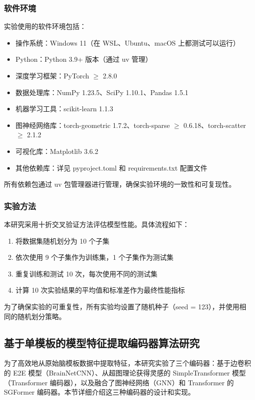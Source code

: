 \documentclass[12pt,a4paper]{article}
\begin{document}
\subsubsection{软件环境}

实验使用的软件环境包括：
\begin{itemize}
\item 操作系统：Windows 11（在 WSL、Ubuntu、macOS 上都测试可以运行）
\item Python：Python 3.9+ 版本（通过 uv 管理）
\item 深度学习框架：PyTorch $\geq$ 2.8.0
\item 数据处理库：NumPy 1.23.5、SciPy 1.10.1、Pandas 1.5.1
\item 机器学习工具：scikit-learn 1.1.3
\item 图神经网络库：torch-geometric 1.7.2、torch-sparse $\geq$ 0.6.18、torch-scatter $\geq$ 2.1.2
\item 可视化库：Matplotlib 3.6.2
\item 其他依赖库：详见 pyproject.toml 和 requirements.txt 配置文件
\end{itemize}

所有依赖包通过 uv 包管理器进行管理，确保实验环境的一致性和可复现性。

\subsubsection{实验方法}

本研究采用十折交叉验证方法评估模型性能。具体流程如下：
\begin{enumerate}
\item 将数据集随机划分为 10 个子集
\item 依次使用 9 个子集作为训练集，1 个子集作为测试集
\item 重复训练和测试 10 次，每次使用不同的测试集
\item 计算 10 次实验结果的平均值和标准差作为最终性能指标
\end{enumerate}

为了确保实验的可重复性，所有实验均设置了随机种子（seed = 123），并使用相同的随机划分策略。

\subsection{基于单模板的模型特征提取编码器算法研究}

为了高效地从原始脑模板数据中提取特征，本研究实验了三个编码器：基于边卷积的 E2E 模型（BrainNetCNN）、从超图理论获得灵感的 SimpleTransformer 模型（Transformer 编码器），以及融合了图神经网络（GNN）和 Transformer 的 SGFormer 编码器。本节详细介绍这三种编码器的设计和实现。
\end{document}
